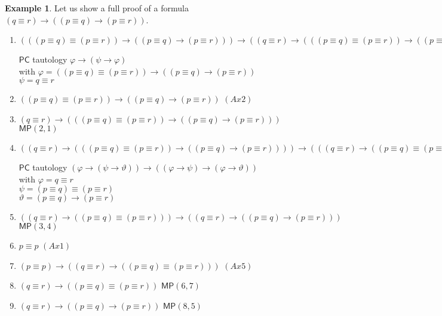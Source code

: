 \documentclass{article}
\theoremstyle{definition}
\theoremstyle{definition}
\newtheorem{example}{Example}[section]
\theoremstyle{definition}
\newcommand*{\id}{\equiv}
\newcommand*{\ra}{\rightarrow}
\newcommand{\PC}{$\mathsf{PC}$\xspace}
\newcommand{\MP}{\mathsf{MP}}
\begin{document}
\begin{example}
    \label{ex_pqr}
    Let us show a full proof of a formula $(q \id r) \ra ((p \id q) \ra (p \id r))$.

    \begin{enumerate}
        \item $(((p \id q) \id (p \id r)) \ra ((p \id q) \ra (p \id r))) \ra ((q \id r) \ra (((p \id q) \id (p \id r)) \ra ((p \id q) \ra (p \id r)))) $
              \begin{flushright} \PC tautology $\varphi \ra (\psi \ra \varphi)$ \\
                  with $\varphi = ((p \id q) \id (p \id r)) \ra ((p \id q) \ra (p \id r))$\\
                  $\psi = q \id r$
              \end{flushright}
        \item $((p \id q) \id (p \id r)) \ra ((p \id q) \ra (p \id r))  $ \hfill $(Ax2)$
        \item $(q \id r) \ra (((p \id q) \id (p \id r)) \ra ((p \id q) \ra (p \id r)))$ \hfill $\MP(2, 1)$
        \item $((q \id r) \ra (((p \id q) \id (p \id r)) \ra ((p \id q) \ra (p \id r)))) \ra (((q \id r) \ra ((p \id q) \id (p \id r))) \ra ((q \id r) \ra ((p \id q) \ra (p \id r)))) $ \begin{flushright}
                  \PC tautology $(\varphi \ra (\psi \ra \vartheta)) \ra ((\varphi \ra \psi) \ra (\varphi \ra \vartheta))$ \\
                  with $\varphi = q \id r$ \\
                  $\psi = (p \id q) \id (p \id r)$ \\
                  $\vartheta = (p \id q) \ra (p \id r)$
              \end{flushright}
        \item $((q \id r) \ra ((p \id q) \id (p \id r))) \ra ((q \id r) \ra ((p \id q) \ra (p \id r))) $ \hfill $\MP(3, 4)$
        \item $p \id p $ \hfill $(Ax1)$
        \item $(p \id p) \ra ((q \id r) \ra ((p \id q) \id (p \id r)))$ \hfill $(Ax5)$
        \item $(q \id r) \ra ((p \id q) \id (p \id r))$ \hfill $\MP(6, 7)$
        \item $(q \id r) \ra ((p \id q) \ra (p \id r))$ \hfill $\MP(8, 5)$
    \end{enumerate}
\end{example}
\end{document}

